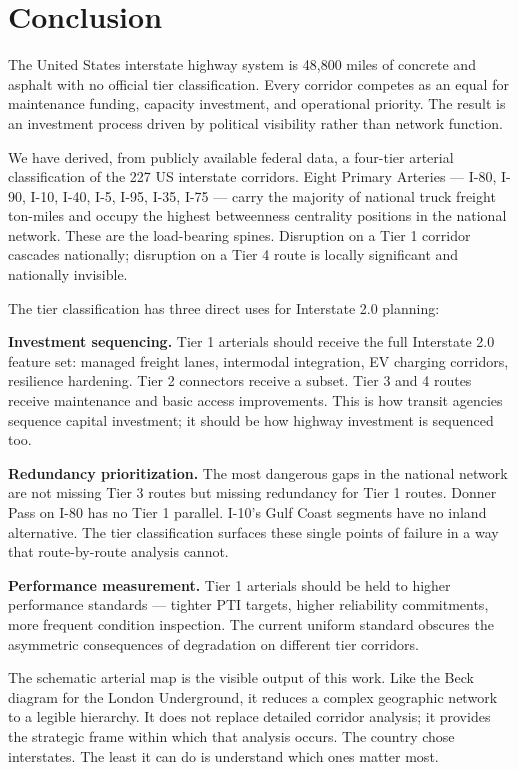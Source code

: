 \section{Conclusion}

The United States interstate highway system is 48,800 miles of concrete and asphalt with no official tier classification. Every corridor competes as an equal for maintenance funding, capacity investment, and operational priority. The result is an investment process driven by political visibility rather than network function.

We have derived, from publicly available federal data, a four-tier arterial classification of the 227 US interstate corridors. Eight Primary Arteries --- I-80, I-90, I-10, I-40, I-5, I-95, I-35, I-75 --- carry the majority of national truck freight ton-miles and occupy the highest betweenness centrality positions in the national network. These are the load-bearing spines. Disruption on a Tier 1 corridor cascades nationally; disruption on a Tier 4 route is locally significant and nationally invisible.

The tier classification has three direct uses for Interstate 2.0 planning:

\textbf{Investment sequencing.} Tier 1 arterials should receive the full Interstate 2.0 feature set: managed freight lanes, intermodal integration, EV charging corridors, resilience hardening. Tier 2 connectors receive a subset. Tier 3 and 4 routes receive maintenance and basic access improvements. This is how transit agencies sequence capital investment; it should be how highway investment is sequenced too.

\textbf{Redundancy prioritization.} The most dangerous gaps in the national network are not missing Tier 3 routes but missing redundancy for Tier 1 routes. Donner Pass on I-80 has no Tier 1 parallel. I-10's Gulf Coast segments have no inland alternative. The tier classification surfaces these single points of failure in a way that route-by-route analysis cannot.

\textbf{Performance measurement.} Tier 1 arterials should be held to higher performance standards --- tighter PTI targets, higher reliability commitments, more frequent condition inspection. The current uniform standard obscures the asymmetric consequences of degradation on different tier corridors.

The schematic arterial map is the visible output of this work. Like the Beck diagram for the London Underground, it reduces a complex geographic network to a legible hierarchy. It does not replace detailed corridor analysis; it provides the strategic frame within which that analysis occurs. The country chose interstates. The least it can do is understand which ones matter most.

